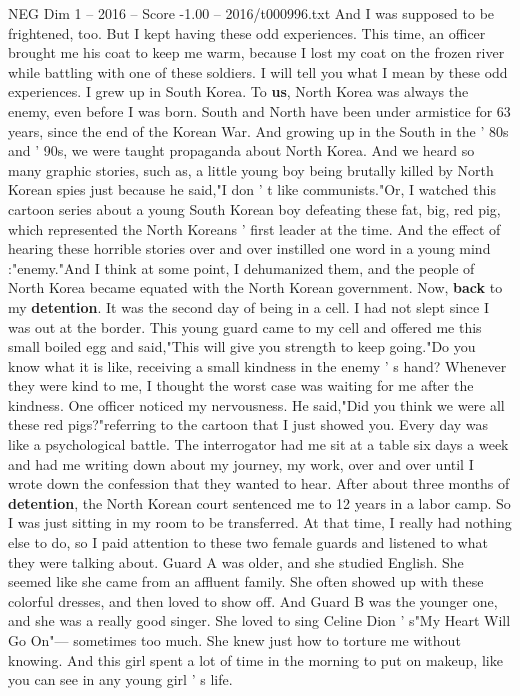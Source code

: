 \begin{textsample}{NEG Dim 1 – 2016 – Score -1.00 – 2016/t000996.txt}
And I was supposed to be frightened, too.
But I kept having these odd experiences.
This time, an officer brought me his coat to keep me warm, because I lost my coat on the frozen river while battling with one of these soldiers.
I will tell you what I mean by these odd experiences.
I grew up in South Korea.
To \textbf{us}, North Korea was always the enemy, even before I was born.
South and North have been under armistice for 63 years, since the end of the Korean War.
And growing up in the South in the ' 80s and ' 90s, we were taught propaganda about North Korea.
And we heard so many graphic stories, such as, a little young boy being brutally killed by North Korean spies just because he said,"I don ' t like communists."Or, I watched this cartoon series about a young South Korean boy defeating these fat, big, red pig, which represented the North Koreans ' first leader at the time.
And the effect of hearing these horrible stories over and over instilled one word in a young mind :"enemy."And I think at some point, I dehumanized them, and the people of North Korea became equated with the North Korean government.
Now, \textbf{back} to my \textbf{detention}.
It was the second day of being in a cell.
I had not slept since I was out at the border.
This young guard came to my cell and offered me this small boiled egg and said,"This will give you strength to keep going."Do you know what it is like, receiving a small kindness in the enemy ' s hand?
Whenever they were kind to me, I thought the worst case was waiting for me after the kindness.
One officer noticed my nervousness.
He said,"Did you think we were all these red pigs?"referring to the cartoon that I just showed you.
Every day was like a psychological battle.
The interrogator had me sit at a table six days a week and had me writing down about my journey, my work, over and over until I wrote down the confession that they wanted to hear.
After about three months of \textbf{detention}, the North Korean court sentenced me to 12 years in a labor camp.
So I was just sitting in my room to be transferred.
At that time, I really had nothing else to do, so I paid attention to these two female guards and listened to what they were talking about.
Guard A was older, and she studied English.
She seemed like she came from an affluent family.
She often showed up with these colorful dresses, and then loved to show off.
And Guard B was the younger one, and she was a really good singer.
She loved to sing Celine Dion ' s"My Heart Will Go On"— sometimes too much.
She knew just how to torture me without knowing.
And this girl spent a lot of time in the morning to put on makeup, like you can see in any young girl ' s life.

\end{textsample}
